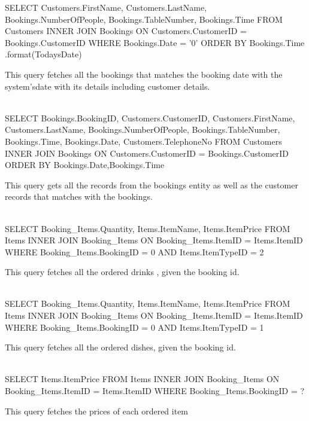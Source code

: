 \begin{sql}
SELECT
 Customers.FirstName,
Customers.LastName,
 Bookings.NumberOfPeople,
 Bookings.TableNumber,
 Bookings.Time
FROM Customers
 INNER JOIN Bookings
 ON Customers.CustomerID = Bookings.CustomerID
 WHERE Bookings.Date = '{0}'
 ORDER BY Bookings.Time
.format(TodaysDate)
\end{sql}
This query fetches all the bookings that matches the booking date with the system'sdate with its details including customer details. \\ \\

\begin{sql}
SELECT
 Bookings.BookingID,
 Customers.CustomerID,
Customers.FirstName,
Customers.LastName,
Bookings.NumberOfPeople,
 Bookings.TableNumber,
 Bookings.Time,
Bookings.Date,
Customers.TelephoneNo
 FROM Customers
 INNER JOIN Bookings
 ON Customers.CustomerID = Bookings.CustomerID
 ORDER BY Bookings.Date,Bookings.Time
\end{sql}
This query gets all the records from the bookings entity as well as the customer records that matches with the bookings. \\ \\

\begin{sql}
SELECT
Booking_Items.Quantity,
 Items.ItemName,
 Items.ItemPrice
 FROM Items
 INNER JOIN Booking_Items
ON Booking_Items.ItemID = Items.ItemID
 WHERE Booking_Items.BookingID = {0}
AND Items.ItemTypeID = 2
\end{sql}
This query fetches all the ordered drinks , given the booking id. \\ \\

\begin{sql}
SELECT
 Booking_Items.Quantity,
 Items.ItemName,
 Items.ItemPrice
 FROM Items
 INNER JOIN Booking_Items
ON Booking_Items.ItemID = Items.ItemID
 WHERE Booking_Items.BookingID = {0}
 AND Items.ItemTypeID = 1
\end{sql}
This query fetches all the ordered dishes, given the booking id. \\ \\

\begin{sql}
SELECT
Items.ItemPrice
 FROM Items
 INNER JOIN Booking_Items
 ON Booking_Items.ItemID = Items.ItemID
WHERE Booking_Items.BookingID = ?
\end{sql}
This query fetches the prices of each ordered item \\ \\


